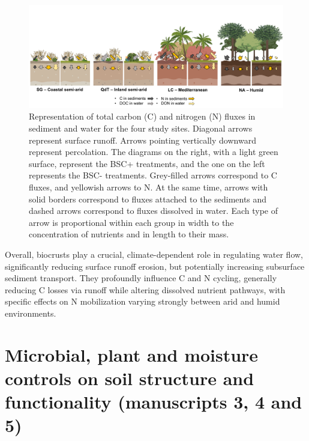 \begin{figure}[ht!]
	\centering
	\includegraphics[width=1\textwidth]{img/nutrient-flow-diagram.png}
	\caption[Conceptual diagram of total carbon (C) and nitrogen (N) fluxes in sediment and water for the four study sites]{Representation of total carbon (C) and nitrogen (N) fluxes in sediment and water for the four study sites. Diagonal arrows represent surface runoff. Arrows pointing vertically downward represent percolation. The diagrams on the right, with a light green surface, represent the BSC+ treatments, and the one on the left represents the BSC- treatments. Grey-filled arrows correspond to C fluxes, and yellowish arrows to N. At the same time, arrows with solid borders correspond to fluxes attached to the sediments and dashed arrows correspond to fluxes dissolved in water. Each type of arrow is proportional within each group in width to the concentration of nutrients and in length to their mass.}
	\label{fig:nutrient-flow}
\end{figure}

\FloatBarrier

Overall, biocrusts play a crucial, climate-dependent role in regulating water flow, significantly reducing surface runoff erosion, but potentially increasing subsurface sediment transport. They profoundly influence C and N cycling, generally reducing C losses via runoff while altering dissolved nutrient pathways, with specific effects on N mobilization varying strongly between arid and humid environments.

\section[Microbial, plant and moisture controls on soil structure and functionality]{Microbial, plant and moisture controls on soil structure and functionality (manuscripts 3, 4 and 5)}
\label{sec:MicrobesPlantsMoistureStructure}

